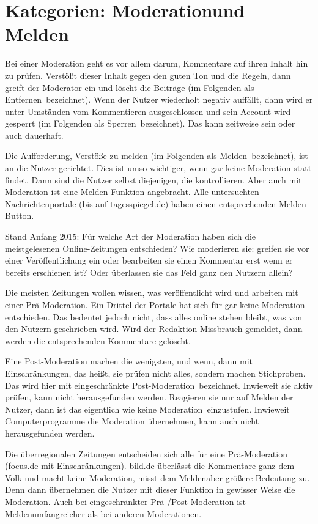\section{Kategorien: \glqq Moderation\grqq und \glqq Melden\grqq}

Bei einer Moderation geht es vor allem darum, Kommentare auf ihren Inhalt hin zu
prüfen. Verstößt dieser Inhalt gegen den guten Ton und die Regeln, dann greift
der Moderator ein und löscht die Beiträge (im Folgenden als \glqq Entfernen\grqq\ bezeichnet). Wenn der Nutzer
wiederholt negativ auffällt, dann wird er unter Umständen vom Kommentieren
ausgeschlossen und sein Account wird gesperrt (im Folgenden als  \glqq Sperren\grqq\ bezeichnet). Das kann zeitweise sein
oder auch dauerhaft.

Die Aufforderung, Verstöße zu melden (im Folgenden als \glqq Melden\grqq\ bezeichnet), ist an die Nutzer gerichtet. Dies
ist umso wichtiger, wenn gar keine Moderation statt findet. Dann sind die Nutzer
selbst diejenigen, die kontrollieren. Aber auch mit Moderation ist eine
Melden-Funktion angebracht. Alle  untersuchten Nachrichtenportale (bis auf
tagesspiegel.de) haben einen entsprechenden Melden-Button.

Stand Anfang 2015: Für welche Art der Moderation haben sich die meistgelesenen
Online-Zeitungen entschieden? Wie moderieren sie: greifen sie vor einer
Veröffentlichung ein oder bearbeiten sie einen Kommentar erst wenn er bereits
erschienen ist? Oder überlassen sie das Feld ganz den Nutzern allein?

Die meisten Zeitungen wollen wissen, was veröffentlicht wird und arbeiten mit
einer Prä-Moderation.
Ein Drittel der Portale hat sich für gar keine Moderation entschieden. Das
bedeutet jedoch nicht, dass alles online stehen bleibt, was von den Nutzern
geschrieben wird. Wird der Redaktion Missbrauch gemeldet, dann werden die
entsprechenden Kommentare gelöscht.

Eine Post-Moderation machen die wenigsten, und wenn, dann mit Einschränkungen,
das heißt, sie prüfen nicht alles, sondern machen Stichproben. Das wird hier mit
\glqq eingeschränkte Post-Moderation\grqq\ bezeichnet. Inwieweit sie aktiv prüfen,
kann nicht herausgefunden werden. Reagieren sie nur auf Melden der Nutzer, dann
ist das eigentlich wie \glqq keine Moderation\grqq\ einzustufen.
Inwieweit Computerprogramme die Moderation übernehmen, kann auch nicht
herausgefunden werden.




Die überregionalen Zeitungen entscheiden sich alle für eine Prä-Moderation (focus.de mit
Einschränkungen). bild.de überlässt die Kommentare ganz dem Volk und macht keine Moderation, 
misst dem \glqq Melden\grqq aber größere Bedeutung zu. Denn dann übernehmen die Nutzer mit dieser Funktion
in gewisser Weise die Moderation. Auch bei \glqq eingeschränkter Prä-/Post-Moderation\grqq
ist \glqq Melden\grqq umfangreicher als bei anderen Moderationen. 


